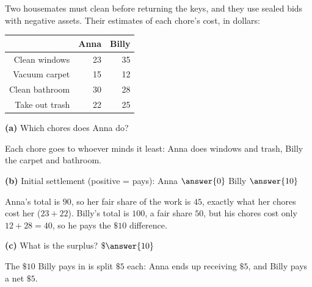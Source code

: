 \documentclass[12pt]{ximera}
\begin{document}
\begin{problem}
Two housemates must clean before returning the keys, and they use sealed bids with
negative assets. Their estimates of each chore's cost, in dollars:
\begin{center}
\begin{tabular}{r|rr}
 & Anna & Billy\\\hline
Clean windows & 23 & 35\\
Vacuum carpet & 15 & 12\\
Clean bathroom & 30 & 28\\
Take out trash & 22 & 25
\end{tabular}
\end{center}

\begin{prompt}
\textbf{(a)} Which chores does Anna do?
\begin{selectAll}
\end{selectAll}
\begin{feedback}
Each chore goes to whoever minds it least: Anna does windows and trash, Billy the carpet
and bathroom.
\end{feedback}
\end{prompt}

\begin{prompt}
\textbf{(b)} Initial settlement (positive = pays): Anna $\answer{0}$ \quad Billy
$\answer{10}$
\begin{feedback}
Anna's total is $90$, so her fair share of the work is $45$, exactly what her chores
cost her ($23+22$). Billy's total is $100$, a fair share $50$, but his chores cost only
$12+28=40$, so he pays the $\$10$ difference.
\end{feedback}
\end{prompt}

\begin{prompt}
\textbf{(c)} What is the surplus? $\$\answer{10}$
\begin{feedback}
The $\$10$ Billy pays in is split $\$5$ each: Anna ends up receiving $\$5$, and Billy
pays a net $\$5$.
\end{feedback}
\end{prompt}
\end{problem}
\end{document}
